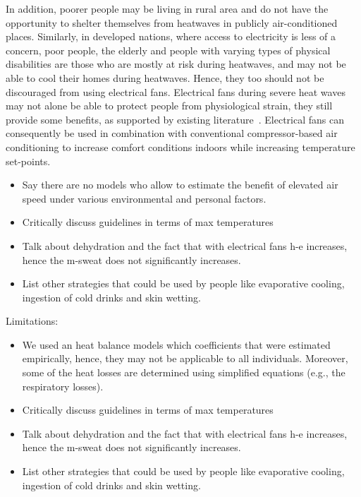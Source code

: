 In addition, poorer people may be living in rural area and do not have the opportunity to shelter themselves from heatwaves in publicly air-conditioned places.
Similarly, in developed nations, where access to electricity is less of a concern, poor people, the elderly and people with varying types of physical disabilities are those who are mostly at risk during heatwaves, and may not be able to cool their homes during heatwaves.
Hence, they too should not be discouraged from using electrical fans.
Electrical fans during severe heat waves may not alone be able to protect people from physiological strain, they still provide some benefits, as supported by existing literature~\cite{Jay2015, Jay2019a}.
Electrical fans can consequently be used in combination with conventional compressor-based air conditioning to increase comfort conditions indoors while increasing temperature set-points.

\begin{itemize}
    \item Say there are no models who allow to estimate the benefit of elevated air speed under various environmental and personal factors.
    \item Critically discuss guidelines in terms of max temperatures
    \item Talk about dehydration and the fact that with electrical fans \ac{h-e} increases, hence the \ac{m-sweat} does not significantly increases. %
    \item List other strategies that could be used by people like evaporative cooling, ingestion of cold drinks and skin wetting.
\end{itemize}

Limitations:
\begin{itemize}
    \item We used an heat balance models which coefficients that were estimated empirically, hence, they may not be applicable to all individuals.
    Moreover, some of the heat losses are determined using simplified equations (e.g., the respiratory losses).

    \item Critically discuss guidelines in terms of max temperatures
    \item Talk about dehydration and the fact that with electrical fans \ac{h-e} increases, hence the \ac{m-sweat} does not significantly increases. %
    \item List other strategies that could be used by people like evaporative cooling, ingestion of cold drinks and skin wetting.
\end{itemize}

